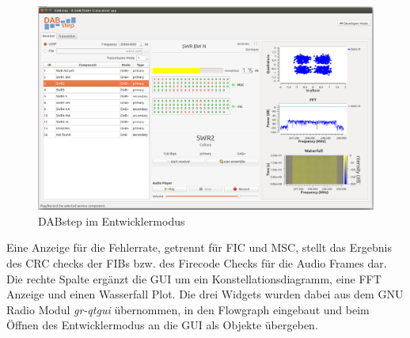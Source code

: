 \begin{figure}[htb]
\centering
  \includegraphics[width=\textwidth]{figures/GUI_dev_mode.png}
	\caption{DABstep im Entwicklermodus}
	\label{fig:GUI_dev_mode}
\end{figure}

Eine Anzeige für die Fehlerrate, getrennt für FIC und MSC, stellt das Ergebnis des CRC checks der FIBs bzw. des Firecode Checks für die Audio Frames dar. Die rechte Spalte ergänzt die GUI um ein Konstellationsdiagramm, eine FFT Anzeige und einen Wasserfall Plot. Die drei Widgets wurden dabei aus dem GNU Radio Modul \textit{gr-qtgui} \cite{repo:gr-qtgui} übernommen, in den Flowgraph eingebaut und beim Öffnen des Entwicklermodus an die GUI als Objekte übergeben.